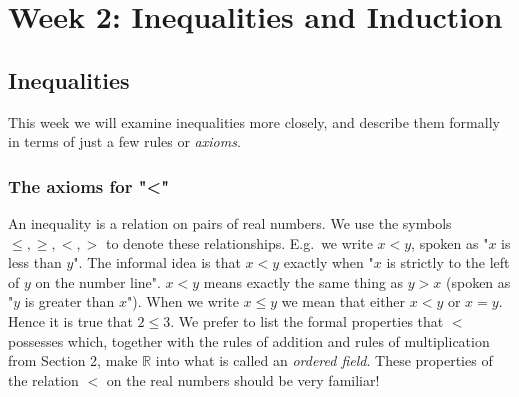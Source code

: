 \documentclass[11pt,dvipsnames]{book}
\numberwithin{equation}{section} %
\numberwithin{figure}{section} %
\numberwithin{table}{section} %
\begin{document}




\pagestyle{empty} %

 \tableofcontents %

\cleardoublepage %

\pagestyle{fancy} %


\setcounter{part}{1}
\part{Week 2: Inequalities and Induction}

\setcounter{chapter}{2}

\chapter{Inequalities}


\setcounter{page}{1}

This week we will examine inequalities more closely, and describe them formally in terms of just a few rules or {\it axioms}. 

\section{The axioms for "<"}

An inequality is a relation on pairs of real numbers.
We use the symbols $\leq,\geq,<,>$ to denote these relationships.
E.g.~we write $x < y$, spoken as "$x$ is less than $y$".
The informal idea is that $x<y$ exactly when "$x$ is strictly to the left of $y$ on the number line".  
$x < y$ means exactly the same thing as $y > x$ (spoken as "$y$ is greater than $x$"). 
When we write $x \leq y$ we mean that either $x < y$ or $x=y$. 
Hence it is true that $2 \leq 3$. 
We prefer to list the formal properties that $<$ possesses which, together with the rules of addition and rules of multiplication from Section 2, make $\mathbb{R}$ into what is called an {\em ordered field}.
These properties of the relation $<$ on the real numbers should be very familiar!
\end{document}
